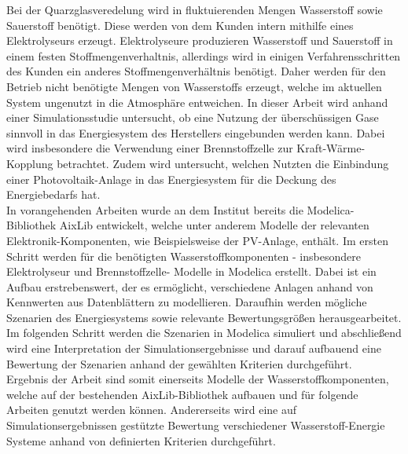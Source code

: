 Bei der Quarzglasveredelung wird in fluktuierenden Mengen Wasserstoff sowie Sauerstoff benötigt. Diese werden von dem Kunden intern mithilfe eines Elektrolyseurs erzeugt. Elektrolyseure produzieren Wasserstoff und Sauerstoff in einem festen Stoffmengenverhaltnis, allerdings wird in einigen Verfahrensschritten des Kunden ein anderes Stoffmengenverhältnis benötigt. Daher werden für den Betrieb nicht benötigte Mengen von Wasserstoffs erzeugt, welche im aktuellen System ungenutzt in die Atmosphäre entweichen. In dieser Arbeit wird anhand einer Simulationsstudie untersucht, ob eine Nutzung der überschüssigen Gase sinnvoll in das Energiesystem des Herstellers eingebunden werden kann. Dabei wird insbesondere die Verwendung einer Brennstoffzelle zur Kraft-Wärme-Kopplung betrachtet. Zudem wird untersucht, welchen Nutzten die Einbindung einer Photovoltaik-Anlage in das Energiesystem für die Deckung des Energiebedarfs hat.\\

In vorangehenden Arbeiten wurde an dem Institut bereits die Modelica-Bibliothek AixLib entwickelt, welche unter anderem Modelle der relevanten Elektronik-Komponenten, wie Beispielsweise der PV-Anlage, enthält. Im ersten Schritt werden für die benötigten Wasserstoffkomponenten - insbesondere Elektrolyseur und Brennstoffzelle- Modelle in Modelica erstellt. Dabei ist ein Aufbau erstrebenswert, der es ermöglicht, verschiedene Anlagen anhand von Kennwerten aus Datenblättern zu modellieren. Daraufhin werden mögliche Szenarien des Energiesystems sowie relevante Bewertungsgrößen herausgearbeitet. Im folgenden Schritt werden die Szenarien in Modelica simuliert und abschließend wird eine Interpretation der Simulationsergebnisse und darauf aufbauend eine Bewertung der Szenarien anhand der gewählten Kriterien durchgeführt.\\
Ergebnis der Arbeit sind somit einerseits Modelle der Wasserstoffkomponenten, welche auf der bestehenden AixLib-Bibliothek aufbauen und für folgende Arbeiten genutzt werden können. Andererseits wird eine auf Simulationsergebnissen gestützte Bewertung verschiedener Wasserstoff-Energie Systeme anhand von definierten Kriterien durchgeführt.
